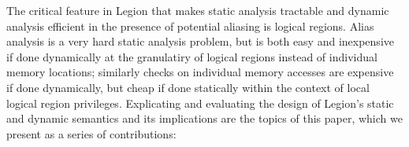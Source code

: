 The critical feature in Legion that makes static analysis tractable
and dynamic analysis efficient in the presence of potential aliasing is logical regions.
Alias analysis is a very hard static analysis problem, but is both easy and
inexpensive if done dynamically at the granulatiry of logical regions instead
of individual memory locations; similarly
checks on individual memory accesses are expensive if done dynamically, but
cheap if done statically within the context of local logical region privileges.
Explicating and evaluating the design of Legion's
static and dynamic semantics and its implications are the topics of this paper,
which we present as a series of contributions:
